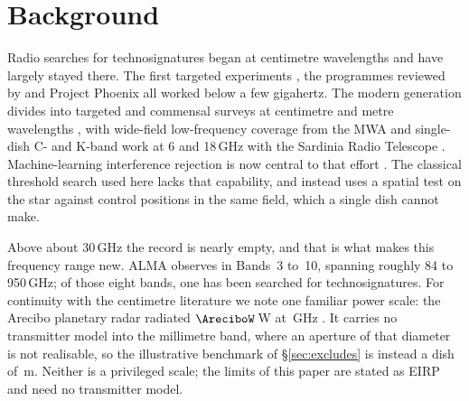 \section{Background}
\label{sec:background}

Radio searches for technosignatures began at centimetre wavelengths and
have largely stayed there. The first targeted experiments
\citep{CocconiMorrison1959,Drake1960}, the programmes reviewed by
\citet{Tarter2001} and Project Phoenix \citep{Backus2002} all worked
below a few gigahertz. The modern generation divides into targeted and
commensal surveys at centimetre and metre wavelengths
\citep{Zhang2020,Czech2021,Morrison2023,FAST3IATLAS2025,LOFARdualsite2023},
with wide-field low-frequency coverage from the MWA \citep{Tremblay2024}
and single-dish C- and K-band work at 6 and 18\,GHz with the Sardinia
Radio Telescope \citep{SRT2025}. Machine-learning interference rejection
is now central to that effort
\citep{Ma2023,Choza2024,GLOBULAR2025,AnomalyParkesGBT2025,BRaTs2026}. The
classical threshold search used here lacks that capability, and instead
uses a spatial test on the star against control positions in the same
field, which a single dish cannot make.

Above about 30\,GHz the record is nearly empty, and that is what makes
this frequency range new. ALMA observes in Bands~3 to~10, spanning
roughly 84 to 950\,GHz; of those eight bands, one has been searched for
technosignatures. For continuity with the centimetre literature we note
one familiar power scale: the Arecibo planetary radar radiated
$\AreciboW$\,W at \ArecGHz\,GHz
\citep{Drake1974,EarthDetectingEarth2025}. It carries no transmitter
model into the millimetre band, where an aperture of that diameter is not
realisable, so the illustrative benchmark of \S\ref{sec:excludes} is
instead a dish of \BenchDiam\,m. Neither is a privileged scale; the limits
of this paper are stated as EIRP and need no transmitter model.

